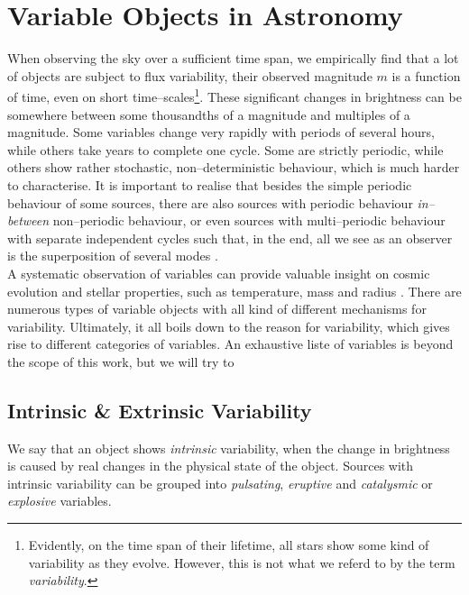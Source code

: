 \section{Variable Objects in Astronomy}
\label{sec:theory-variable-objects}

When observing the sky over a sufficient time span, we empirically find that a lot of objects are subject to flux variability, \ie their observed magnitude $m$ is a function of time, even on short time--scales\footnote{Evidently, on the time span of their lifetime, all stars show some kind of variability as they evolve. However, this is not what we referd to by the term \emph{variability}.}. These significant changes in brightness can be somewhere between some thousandths of a magnitude and multiples of a magnitude. Some variables change very rapidly with periods of several hours, while others take years to complete one cycle. Some are strictly periodic, while others show rather stochastic, non--deterministic behaviour, which is much harder to characterise. It is important to realise that besides the simple periodic behaviour of some sources, there are also sources with periodic behaviour \emph{in--between} non--periodic behaviour, or even sources with multi--periodic behaviour with separate independent cycles such that, in the end, all we see as an observer is the superposition of several modes \citep{hanslmeier2007}.\\

A systematic observation of variables can provide valuable insight on cosmic evolution and stellar properties, such as temperature, mass and radius \citep{percy2007}. There are numerous types of variable objects with all kind of different mechanisms for variability. Ultimately, it all boils down to the reason for variability, which gives rise to different categories of variables. An exhaustive liste of variables is beyond the scope of this work, but we will try to 


\subsection{Intrinsic \& Extrinsic Variability}
\label{subsec:intrinsic-extrinsic-variability}

We say that an object shows \emph{intrinsic} variability, when the change in brightness is caused by real changes in the physical state of the object. Sources with intrinsic variability can be grouped into \emph{pulsating}, \emph{eruptive} and \emph{catalysmic} or \emph{explosive} variables.

